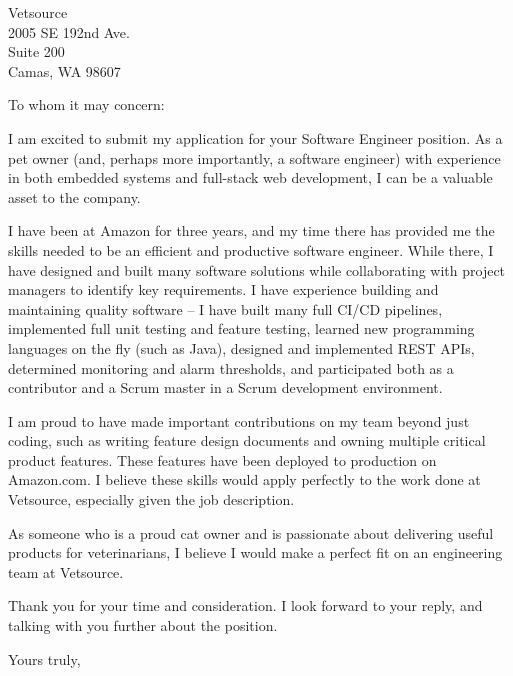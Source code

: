 \documentclass{letter}
\begin{document}
    \begin{letter}{Vetsource \\ 2005 SE 192nd Ave. \\ Suite 200
            \\ Camas, WA 98607}
        \opening{To whom it may concern:}

        I am excited to submit my application for your Software Engineer 
        position. As a pet owner (and, perhaps more importantly, a software 
        engineer) with experience in both embedded systems and full-stack web 
        development, I can be a valuable asset to the company.

        I have been at Amazon for three years, and my time there has provided me
        the skills needed to be an efficient and productive software engineer. 
        While there, I have designed and built many software solutions while 
        collaborating with project managers to identify key requirements. I 
        have experience building and maintaining quality software -- I have built
        many full CI/CD pipelines, implemented full unit testing and feature 
        testing, learned new programming languages on the fly (such as Java), 
        designed and implemented REST APIs, determined monitoring and alarm 
        thresholds, and participated both as a contributor and a Scrum master 
        in a Scrum development environment.
        
        I am proud to have made important contributions on my team beyond just
        coding, such as writing feature design documents and owning multiple 
        critical product features. These features have been deployed to production
        on Amazon.com. I believe these skills would apply perfectly to the work
        done at Vetsource, especially given the job description.

        As someone who is a proud cat owner and is passionate about delivering
        useful products for veterinarians, I believe I would make a perfect fit
        on an engineering team at Vetsource.

        Thank you for your time and consideration. I look forward to your reply, 
        and talking with you further about the position.

        \closing{Yours truly,}

    \end{letter}
\end{document}
